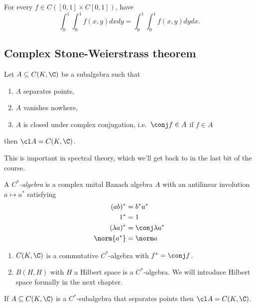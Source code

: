 \documentclass[a4paper]{article}
\begin{document}
\begin{corollary}
  For every \(f \in C([0, 1] \times C[0, 1])\), have
  \[
    \int_0^1 \int_0^1 f(x, y) dx dy = \int_0^1 \int_0^1 f(x, y) dy dx.
  \]
\end{corollary}

\subsection{Complex Stone-Weierstrass theorem}

\begin{theorem}
  Let \(A \subseteq C(K, \C)\) be a subalgebra such that
  \begin{enumerate}
  \item \(A\) separates points,
  \item \(A\) vanishes nowhere,
  \item \(A\) is closed under complex conjugation, i.e.\ \(\conj f \in A\) if \(f \in A\)
  \end{enumerate}
  then \(\cl A = C(K, \C)\).
\end{theorem}

This is important in spectral theory, which we'll get back to in the last bit of the course.

\begin{definition}[\(C^*\)-algebra]
  A \emph{\(C^*\)-algebra} is a complex unital Banach algebra \(A\) with an antilinear involution \(a \mapsto a^*\) satisfying
  \begin{align*}
    (ab)^* & = b^*a^* \\
    1^* &= 1 \\
    (\lambda a)^* &= \conj \lambda a^* \\
    \norm{a^*} &= \norm a
  \end{align*}
\end{definition}

\begin{eg}\leavevmode
  \begin{enumerate}
  \item \(C(K, \C)\) is a commutative \(C^*\)-algebra with \(f^* = \conj f\).
  \item \(B(H, H)\) with \(H\) a Hilbert space is a \(C^*\)-algebra. We will introduce Hilbert space formally in the next chapter.
  \end{enumerate}
\end{eg}

\begin{corollary}
  If \(A \subseteq C(K, \C)\) is a \(C^*\)-subalgebra that separates points then \(\cl A = C(K, \C)\).
\end{corollary}
\end{document}
